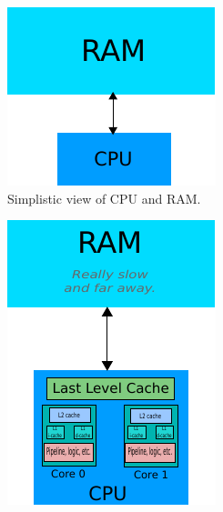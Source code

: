 \begin{figure}[h]
\begin{subfigure}{0.4\textwidth}
\includegraphics[width=\linewidth]{ram-cpu-simple.pdf}
\caption{Simplistic view of CPU and RAM.} \label{fig:1a}
\end{subfigure}
\hfill
\begin{subfigure}{0.4\textwidth}
\includegraphics[width=\linewidth]{ram-cpu-complex.pdf}

\end{subfigure}
\end{figure}
